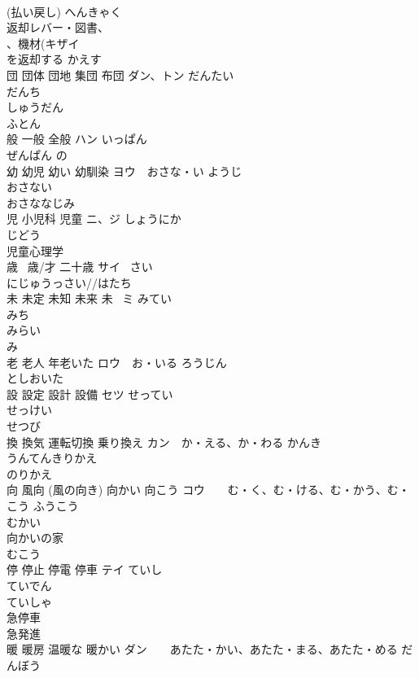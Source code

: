 \documentclass[8pt]{extreport}
\begin{document}
\begin{CJK}{UTF8}{min}
\\	(払い戻し) へんきゃく 
\\	返却レバー・図書、
\\	、機材(キザイ 
\\	を返却する かえす 
\\	団 団体 団地 集団 布団	ダン、トン だんたい 
\\	だんち 
\\	しゅうだん 
\\	ふとん 
\\	般 一般 全般	ハン いっぱん　
\\	ぜんぱん の　
\\	幼 幼児 幼い 幼馴染	ヨウ　おさな・い ようじ 
\\	おさない 
\\	おさななじみ 
\\	児 小児科 児童	ニ、ジ しょうにか　
\\	じどう 
\\	児童心理学 
\\	歳 ~歳/才 二十歳	サイ ~さい　
\\	にじゅうっさい//はたち 
\\	未 未定 未知 未来 未~	ミ みてい 
\\	みち 
\\	みらい 
\\	み~ 
\\	老 老人 年老いた	ロウ　お・いる ろうじん　
\\	としおいた 
\\	設 設定 設計 設備	セツ せってい 
\\	せっけい 
\\	せつび 
\\	換 換気 運転切換 乗り換え	カン　か・える、か・わる かんき　
\\	うんてんきりかえ 
\\	のりかえ 
\\	向 風向 (風の向き) 向かい 向こう	コウ　　む・く、む・ける、む・かう、む・こう ふうこう 
\\	むかい 
\\	向かいの家 
\\	むこう 
\\	停 停止 停電 停車	テイ ていし 
\\	ていでん 
\\	ていしゃ 
\\	急停車 
\\	急発進
\\	暖 暖房 温暖な 暖かい	ダン　　あたた・かい、あたた・まる、あたた・める だんぼう　　

\end{CJK}
\end{document}
